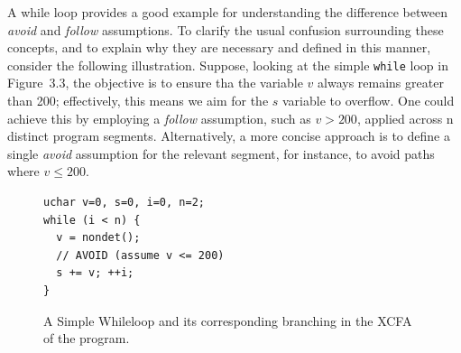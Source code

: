 A while loop provides a good example for understanding the difference between 
\emph{avoid} and \emph{follow} assumptions.
To clarify the usual confusion surrounding these concepts, and to explain why they 
are necessary and defined in this manner, consider the following illustration.
Suppose, looking at the simple \texttt{while} loop in Figure~3.3, the objective is 
to ensure tha the variable $v$ always remains greater than 200; effectively, this means 
we aim for the $s$ variable to overflow.
One could achieve this by employing a \emph{follow} assumption, such as $v > 200$, 
applied across n distinct program segments.
Alternatively, a more concise approach is to define a single \emph{avoid} 
assumption for the relevant segment, for instance, to avoid paths where $v \le 200$.

\begin{figure}[H]
  \centering
  \begin{minipage}[t]{0.40\textwidth}
    \begin{lstlisting}[style=c]
uchar v=0, s=0, i=0, n=2;
while (i < n) {
  v = nondet(); 
  // AVOID (assume v <= 200)
  s += v; ++i;
}\end{lstlisting}
  \end{minipage}

  \caption{A Simple Whileloop and its corresponding branching in the XCFA of the program.}
  \label{fig:combined}
\end{figure}

